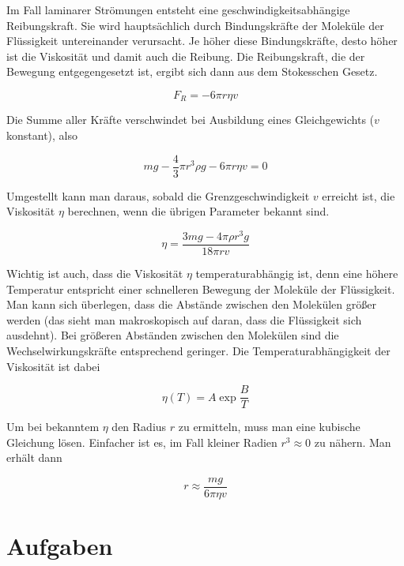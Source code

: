 \documentclass[a4paper,german,12pt,smallheadings]{scrartcl}
\begin{document}
Im Fall laminarer Strömungen entsteht eine geschwindigkeitsabhängige
Reibungskraft. Sie wird hauptsächlich durch Bindungskräfte der Moleküle der
Flüssigkeit untereinander verursacht. Je höher diese Bindungskräfte, desto
höher ist die Viskosität und damit auch die Reibung. Die Reibungskraft, die der
Bewegung entgegengesetzt ist, ergibt sich dann aus dem Stokesschen Gesetz.

\begin{equation}
  F_R = -6 \pi r \eta v
\end{equation}

Die Summe aller Kräfte verschwindet bei Ausbildung eines Gleichgewichts ($v$
konstant), also

\begin{equation}
  mg - \frac{4}{3} \pi r^3 \rho g - 6 \pi r \eta v = 0
\end{equation}

Umgestellt kann man daraus, sobald die Grenzgeschwindigkeit $v$ erreicht ist,
die Viskosität $\eta$ berechnen, wenn die übrigen Parameter bekannt sind.

\begin{equation}
  \eta = \frac{3mg - 4 \pi \rho r^3 g}{18 \pi r v}
  \label{visco}
\end{equation}

Wichtig ist auch, dass die Viskosität $\eta$ temperaturabhängig ist, denn eine
höhere Temperatur entspricht einer schnelleren Bewegung der Moleküle der
Flüssigkeit. Man kann sich überlegen, dass die Abstände zwischen den Molekülen
größer werden (das sieht man makroskopisch auf daran, dass die Flüssigkeit sich
ausdehnt). Bei größeren Abständen zwischen den Molekülen sind die
Wechselwirkungskräfte entsprechend geringer. Die Temperaturabhängigkeit der
Viskosität ist dabei

\begin{equation}
  \eta(T) = A \exp \frac{B}{T}
  \label{temp_dep}
\end{equation}

Um bei bekanntem $\eta$ den Radius $r$ zu ermitteln, muss man eine kubische
Gleichung lösen. Einfacher ist es, im Fall kleiner Radien $r^3 \approx 0$ zu
nähern. Man erhält dann

\begin{equation}
  r \approx \frac{mg}{6 \pi \eta v}
\end{equation}

\section*{Aufgaben}
\end{document}

